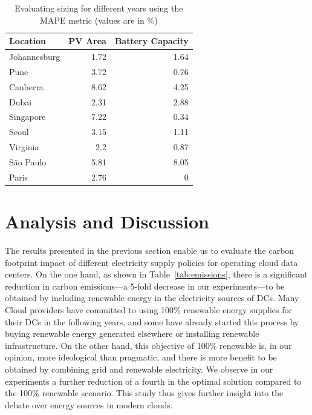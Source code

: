 \begin{table}[h]
  
  \caption{Evaluating sizing for different years using the MAPE metric (values are in \%) }\label{tab:years_MAPE} \centering

  \begin{tabular}{|l|r|r|}
   \hline
    
  \textbf{Location} &   \textbf{PV Area} & \textbf{Battery Capacity} \\
  \hline
  Johannesburg & 1.72 & 1.64  \\
  \hline
  Pune  & 3.72 & 0.76  \\
  \hline
  Canberra  & 8.62 & 4.25 \\
  \hline
  Dubai   & 2.31 & 2.88   \\
  \hline
  Singapore & 7.22 & 0.34 \\
  \hline     
  Seoul    & 3.15 & 1.11 \\
  \hline
  Virginia   & 2.2 & 0.87 \\
  \hline
  São Paulo   & 5.81 & 8.05 \\
  \hline 
  Paris    & 2.76 & 0     \\
  \hline  

\end{tabular}  
\end{table}


\section{Analysis and Discussion}
\label{sec:analysis-discussion_ccgrid}

The results presented in the previous section enable us to evaluate the carbon footprint impact of different electricity supply policies for operating cloud data centers. On the one hand, as shown in Table~\ref{tab:emissions}, there is a significant reduction in carbon emissions---a 5-fold decrease in our experiments---to be obtained by including renewable energy in the electricity sources of DCs. Many Cloud providers have committed to using 100\% renewable energy supplies for their DCs in the following years, and some have already started this process by buying renewable energy generated elsewhere or installing renewable infrastructure. On the other hand, this objective of 100\% renewable is, in our opinion, more ideological than pragmatic, and there is more benefit to be obtained by combining grid and renewable electricity. We observe in our experiments a further reduction of a fourth in the optimal solution compared to the 100\% renewable scenario. This study thus gives further insight into the debate over energy sources in modern clouds.

